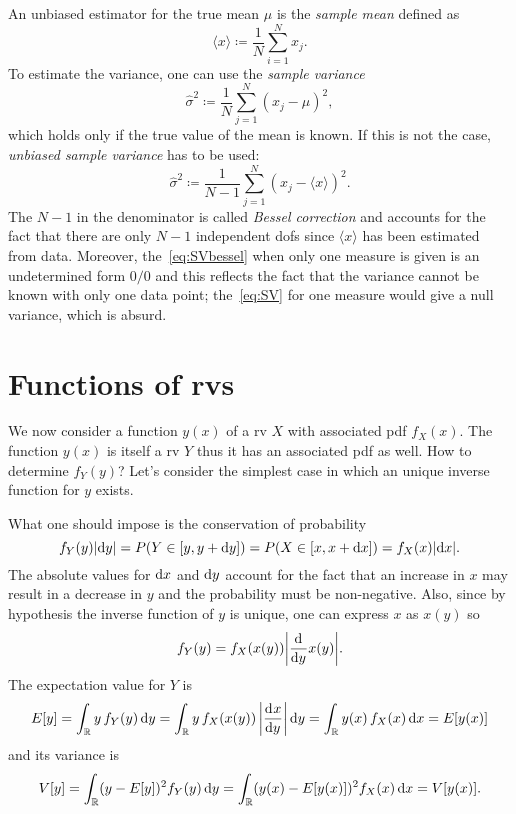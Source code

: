 \documentclass[
	10pt,
	draft
]{scrreprt}
\newcommand{\deriv}[3][]{\dfrac{\ud^{#1}#2}{\ud #3^{#1}}}%
\newcommand{\mean}[1]{\ensuremath{\langle#1\rangle}}
\begin{document}
An unbiased estimator for the true mean $\mu$ is the \emph{sample mean} defined as
\begin{equation}\label{eq:SV}
\mean{x} \coloneqq \frac{1}{N}\sum_{i=1}^N x_j.
\end{equation}
To estimate the variance, one can use the \emph{sample variance}
\begin{equation}
\hat \sigma^2 \coloneqq \frac{1}{N}\sum_{j=1}^N(x_j - \mu)^2,
\end{equation}
which holds only if the true value of the mean is known.
If this is not the case, \emph{unbiased sample variance} has to be used:
\begin{equation}\label{eq:SVbessel}
\hat\sigma^2 \coloneqq \frac{1}{N-1}\sum_{j=1}^N(x_j - \mean{x})^2.
\end{equation}
The $N-1$ in the denominator is called \emph{Bessel correction} and accounts for the fact that there are only $N-1$ independent \acsp{dof} since \mean{x} has been estimated from data.
Moreover, the~\eqref{eq:SVbessel} when only one measure is given is an undetermined form $0/0$ and this reflects the fact that the variance cannot be known with only one data point; the~\eqref{eq:SV} for one measure would give a null variance, which is absurd.

		\section{Functions of \acsp{rv}}

We now consider a function $y(x)$ of a \ac{rv} $X$ with associated \ac{pdf} $f_X(x)$.
The function $y(x)$ is itself a \ac{rv} $Y$ thus it has an associated \ac{pdf} as well.
How to determine $f_Y(y)$?
Let's consider the simplest case in which an unique inverse function for $y$ exists.


What one should impose is the conservation of probability
\begin{equation}
f_Y(y)\lvert\mathop{}\!\mathrm{d} y\rvert = P(Y\in[y,y+\mathop{}\!\mathrm{d} y]) = P( X\in[x,x+\mathop{}\!\mathrm{d} x]) = f_X(x)\lvert\mathop{}\!\mathrm{d} x\rvert.
\end{equation}
The absolute values for $\mathop{}\!\mathrm{d} x$ and $\mathop{}\!\mathrm{d} y$ account for the fact that an increase in $x$ may result in a decrease in $y$ and the probability must be non-negative.
Also, since by hypothesis the inverse function of $y$ is unique, one can express $x$ as $x(y)$ so
\begin{equation}
f_Y(y) = f_X(x(y))\abs[\bigg]{\deriv{}{y}x(y)}.
\end{equation}
The expectation value for $Y$ is 
\begin{equation}
E[y] =
\int_\R y\,f_Y(y)\ud y =
\int_\R y\,f_X(x(y))\,\abs[\bigg]{\deriv{x}{y}}\ud y
= \int_\R y(x)\,f_X(x)\ud x
= E[y(x)]
\end{equation}
and its variance is
\begin{equation}
V[y] %
= \int_\R (y-E[y])^2 f_Y(y)\ud y
=\int_\R (y(x)-E[y(x)])^2 f_X(x)\ud x
= V[y(x)].
\end{equation}
\end{document}
